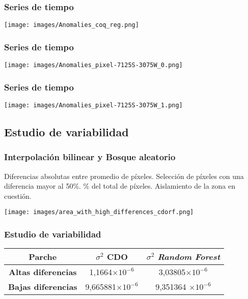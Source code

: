 \documentclass{beamer}
\begin{document}
  \begin{frame}
    \frametitle{Series de tiempo}
    
    \centering
    \texttt{[image: images/Anomalies\_coq\_reg.png]}
  
  \end{frame}

  \begin{frame}
    \frametitle{Series de tiempo}
    
    \centering
    \texttt{[image: images/Anomalies\_pixel-7125S-3075W\_0.png]}
  \end{frame}

  \begin{frame}
    \frametitle{Series de tiempo}
    
    \centering
    \texttt{[image: images/Anomalies\_pixel-7125S-3075W\_1.png]}
  \end{frame}

  \subsection*{Estudio de variabilidad}

  \begin{frame}
    \frametitle{Interpolación bilinear y Bosque aleatorio}

    \begin{outline}
      \1 Diferencias absolutas entre promedio de píxeles.
        \2 Selección de píxeles con una diferencia mayor al 50\%.
          \% del total de píxeles.
      \1 Aislamiento de la zona en cuestión.
    \end{outline}

    \centering
    \texttt{[image: images/area\_with\_high\_differences\_cdorf.png]}

  \end{frame}

  \begin{frame}
    \frametitle{Estudio de variabilidad}

    \begin{center}
      \begin{tabular}{|c|c|c|}
        \hline
        \textbf{Parche}	& \textbf{$\sigma^2$ CDO}	& \textbf{$\sigma^2$ \textit{Random Forest}} \\
        \hline
        \textbf{Altas diferencias}		& 1,1664$\times 10^{-6}$ &3,03805$\times 10^{-6}$  \\
        \textbf{Bajas diferencias}		 & 9,665881$\times 10^{-6}$ & 9,351364 $\times 10^{-6}$\\
        \hline
      \end{tabular}
    \end{center}
  \end{frame}
\end{document}
